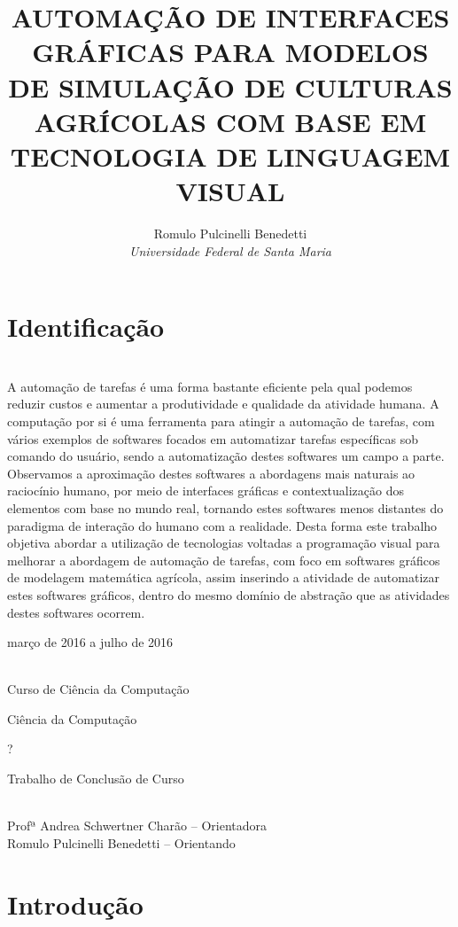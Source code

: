 \documentclass[12pt]{article}
\title{AUTOMAÇÃO DE INTERFACES GRÁFICAS PARA MODELOS DE SIMULAÇÃO DE CULTURAS AGRÍCOLAS COM BASE EM TECNOLOGIA DE LINGUAGEM VISUAL}
\author{Romulo Pulcinelli Benedetti \\ \emph{Universidade Federal de Santa Maria}}
\begin{document}
	\maketitle
	
	\section{Identificação}
	
	\begin{description} \itemsep 0pt
		\item[Resumo:] ~\\
				 
	A automação de tarefas é uma forma bastante eficiente pela qual podemos reduzir custos e aumentar a produtividade e qualidade da atividade humana. A computação por si é uma ferramenta para atingir a automação de tarefas, com vários exemplos de softwares focados em automatizar tarefas específicas sob comando do usuário, sendo a automatização destes softwares um campo a parte. Observamos a aproximação destes softwares a abordagens mais naturais ao raciocínio humano, por meio de interfaces gráficas e contextualização dos elementos com base no mundo real, tornando estes softwares menos distantes do paradigma de interação do humano com a realidade. Desta forma este trabalho objetiva abordar a utilização de tecnologias voltadas a programação visual para melhorar a abordagem de automação de tarefas, com foco em softwares gráficos de modelagem matemática agrícola, assim inserindo a atividade de automatizar estes softwares gráficos, dentro do mesmo domínio de abstração que as atividades destes softwares ocorrem.
		 
		\item[Período de execução:] março de 2016 a julho de 2016
		\item[Unidades participantes:] ~\\ Curso de Ciência da Computação
		\item[Área de conhecimento:] Ciência da Computação
		\item[Linha de Pesquisa:] ?
		\item[Tipo de projeto:] Trabalho de Conclusão de Curso
		\item[Participantes:] ~\\ Profª Andrea Schwertner Charão -- Orientadora \\ Romulo Pulcinelli Benedetti -- Orientando
	\end{description}
	
	\section{Introdução}
	
\end{document}
